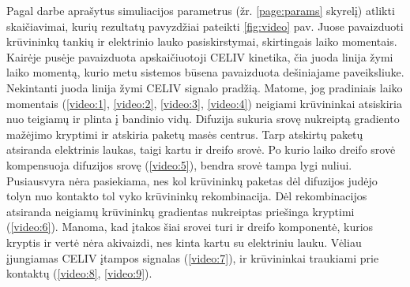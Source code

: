 Pagal darbe aprašytus simuliacijos parametrus (žr. \ref{page:params} skyrelį) atlikti skaičiavimai, kurių rezultatų pavyzdžiai pateikti \ref{fig:video} pav.
Juose pavaizduoti krūvininkų tankių ir elektrinio lauko pasiskirstymai, skirtingais laiko momentais. Kairėje pusėje pavaizduota apskaičiuotoji CELIV kinetika, čia juoda linija žymi laiko momentą, kurio metu sistemos būsena pavaizduota dešiniajame paveiksliuke. Nekintanti juoda linija žymi CELIV signalo pradžią.
Matome, jog pradiniais laiko momentais (\ref{video:1}, \ref{video:2}, \ref{video:3}, \ref{video:4}) neigiami krūvininkai atsiskiria nuo teigiamų ir plinta į bandinio vidų. Difuzija sukuria srovę nukreiptą gradiento mažėjimo kryptimi ir atskiria paketų masės centrus. Tarp atskirtų paketų atsiranda elektrinis laukas, taigi kartu ir dreifo srovė. Po kurio laiko dreifo srovė kompensuoja difuzijos srovę (\ref{video:5}), bendra srovė tampa lygi nuliui. Pusiausvyra nėra pasiekiama, nes kol krūvininkų paketas dėl difuzijos judėjo tolyn nuo kontakto tol vyko krūvininkų rekombinacija. Dėl rekombinacijos atsiranda neigiamų krūvininkų gradientas nukreiptas priešinga kryptimi (\ref{video:6}). Manoma, kad įtakos šiai srovei turi ir dreifo komponentė, kurios kryptis ir vertė nėra akivaizdi, nes kinta kartu su elektriniu lauku.
Vėliau įjungiamas CELIV įtampos signalas (\ref{video:7}), ir krūvininkai traukiami prie kontaktų (\ref{video:8}, \ref{video:9}).